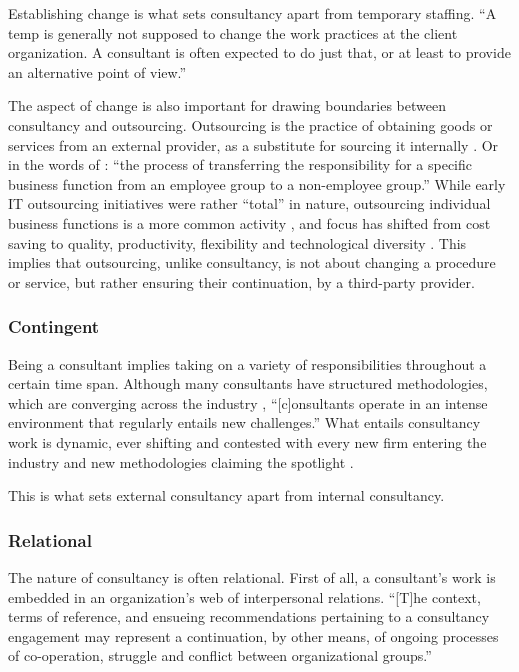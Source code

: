 \documentclass[12pt]{article}
\begin{document}
Establishing change is what sets consultancy apart from temporary
staffing. ``A temp is generally not supposed to change the work
practices at the client organization. A consultant is often expected to
do just that, or at least to provide an alternative point of view.''
\citep[ 5]{furusten2000}

The aspect of change is also important for drawing boundaries between
consultancy and outsourcing. Outsourcing is the practice of obtaining
goods or services from an external provider, as a substitute for
sourcing it internally \citep[ 2]{lacity2012}. Or in the words of
\citet[374]{zhu2001}: ``the process of transferring the responsibility
for a specific business function from an employee group to a
non-employee group.'' While early IT outsourcing initiatives were rather
``total'' \citet{willcocks1995} in nature, outsourcing individual
business functions is a more common activity \citep[ 377]{zhu2001}, and
focus has shifted from cost saving to quality, productivity, flexibility
and technological diversity \citep[ 185]{kirilov2012}. This implies that
outsourcing, unlike consultancy, is not about changing a procedure or
service, but rather ensuring their continuation, by a third-party
provider.

\hypertarget{contingent}{%
\subsubsection{Contingent}\label{contingent}}

Being a consultant implies taking on a variety of responsibilities
throughout a certain time span. Although many consultants have
structured methodologies, which are converging across the industry
\citep[ 17]{werr1986}, ``{[}c{]}onsultants operate in an intense
environment that regularly entails new challenges.'' \citep[
138]{chowdhury2021} What entails consultancy work is dynamic, ever
shifting and contested with every new firm entering the industry and new
methodologies claiming the spotlight \citep[ 24]{kipping2002}.

This is what sets external consultancy apart from internal consultancy.

\hypertarget{relational}{%
\subsubsection{Relational}\label{relational}}

The nature of consultancy is often relational. First of all, a
consultant's work is embedded in an organization's web of interpersonal
relations. ``{[}T{]}he context, terms of reference, and ensueing
recommendations pertaining to a consultancy engagement may represent a
continuation, by other means, of ongoing processes of co-operation,
struggle and conflict between organizational groups.''
\citep{bloomfield1995}
\end{document}

